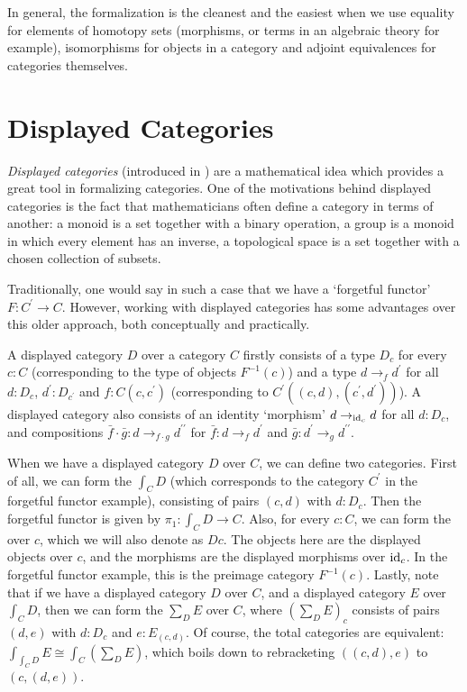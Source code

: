 In general, the formalization is the cleanest and the easiest when we use equality for elements of homotopy sets (morphisms, or terms in an algebraic theory for example), isomorphisms for objects in a category and adjoint equivalences for categories themselves.

\section{Displayed Categories}\label{sec:displayed-categories}

\textit{Displayed categories} (introduced in \autocite{displayed-categories}) are a mathematical idea which provides a great tool in formalizing categories. One of the motivations behind displayed categories is the fact that mathematicians often define a category in terms of another: a monoid is a set together with a binary operation, a group is a monoid in which every element has an inverse, a topological space is a set together with a chosen collection of subsets.

Traditionally, one would say in such a case that we have a `forgetful functor' $ F : C^\prime \to C $. However, working with displayed categories has some advantages over this older approach, both conceptually and practically.

A displayed category $ D $ over a category $ C $ firstly consists of a type $ D_c $ for every $ c : C $ (corresponding to the type of objects $ F^{-1}(c) $) and a type $ d \to_f d^\prime $ for all $ d: D_c $, $ d^\prime : D_{c^\prime} $ and $ f : C(c, c^\prime) $ (corresponding to $ C^\prime((c, d), (c^\prime, d^\prime)) $). A displayed category also consists of an identity `morphism' $ d \to_{\text{id}_{c}} d $ for all $ d : D_c $, and compositions $ \bar f \cdot \bar g : d \to_{f \cdot g} d^{\prime \prime} $ for $ \bar f : d \to_f d^\prime $ and $ \bar g : d^\prime \to_g d^{\prime \prime} $.

When we have a displayed category $ D $ over $ C $, we can define two categories. First of all, we can form the  $ \int_C D $ (which corresponds to the category $ C^\prime $ in the forgetful functor example), consisting of pairs $ (c, d) $ with $ d : D_c $. Then the forgetful functor is given by $ \pi_1 : \int_C D \to C $. Also, for every $ c : C $, we can form the  over $ c $, which we will also denote as $ D c $. The objects here are the displayed objects over $ c $, and the morphisms are the displayed morphisms over $ \text{id}_{c} $. In the forgetful functor example, this is the preimage category $ F^{-1}(c) $. Lastly, note that if we have a displayed category $ D $ over $ C $, and a displayed category $ E $ over $ \int_C D $, then we can form the  $ \sum_D E $ over $ C $, where $ (\sum_D E)_c $ consists of pairs $ (d, e) $ with $ d : D_c $ and $ e : E_{(c, d)} $. Of course, the total categories are equivalent: $ \int_{\int_C D} E \cong \int_C (\sum_D E) $, which boils down to rebracketing $ ((c, d), e) $ to $ (c, (d, e)) $.

